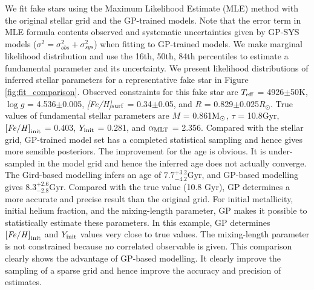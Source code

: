 We fit fake stars using the Maximum Likelihood Estimate (MLE) method with the original stellar grid and the GP-trained models. Note that the error term in MLE formula contents observed and systematic uncertainties given by GP-SYS models ($\sigma^{2} = \sigma_{obs}^{2} +  \sigma_{sys}^{2} $) when fitting to GP-trained models. We make marginal likelihood distribution and use the 16th, 50th, 84th percentiles to estimate a fundamental parameter and its uncertainty. 
%
We present likelihood distributions of inferred stellar parameters for a representative fake star in Figure \ref{fig:fit_comparison}. 
Observed constraints for this fake star are $T_{\rm eff}$ = 4926$\pm$50K, $\log g$ = 4.536$\pm$0.005, {\it [Fe/H]}$_{\rm surf}$ =  0.34$\pm$0.05, and $R$ =  0.829$\pm$0.025$R_{\odot}$. True values of fundamental stellar parameters are $M$ = 0.861$\rm M_{\odot}$, $\tau$ = 10.8Gyr, $\rm {\it [Fe/H]}_{init}$ = 0.403, $Y_{\rm init}$ = 0.281, and $\alpha_{\rm MLT}$ = 2.356. 
%
Compared with the stellar grid, GP-trained model set has a completed statistical sampling and hence gives more sensible posteriors. The improvement for the age is obvious. It is under-sampled in the model grid and hence the inferred age does not actually converge. The Gird-based modelling infers an age of $7.7^{+3.2}_{-4.2}$Gyr, and GP-based modelling gives $8.3^{+2.6}_{-2.8}$Gyr. Compared with the true value (10.8 Gyr), GP determines a more accurate and precise result than the original grid. 
%
For initial metallicity, initial helium fraction, and the mixing-length parameter, GP makes it possible to statistically estimate these parameters. In this example, GP determines ${\it [Fe/H]}_{\rm init}$ and $Y_{\rm init}$ values very close to true values. The mixing-length parameter is not constrained because no correlated observable is given. This comparison clearly shows the advantage of GP-based modelling. It clearly improve the sampling of a sparse grid and hence improve the accuracy and precision of estimates. 

